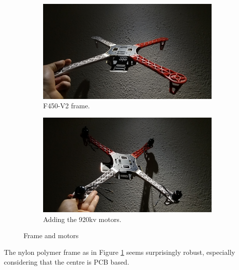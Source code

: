 \begin{figure}[H]
\begin{subfigure}{0.5\textwidth}
\centering
\includegraphics[scale=0.1]{images/drone-build-frame.jpg}
\caption{F450-V2 frame.}
\label{fig:frame}
\end{subfigure}
\begin{subfigure}{0.5\textwidth}
\centering
\includegraphics[scale=0.1]{images/drone-build-motors.jpg}
\caption{Adding the 920kv motors.}
\label{fig:motors}
\end{subfigure}
\caption{Frame and motors}
\label{fig:frame_motors}
\end{figure}

The nylon polymer frame as in Figure \ref{fig:frame} seems surprisingly robust, especially considering that the centre is PCB based.\\


